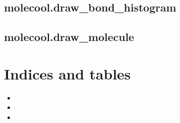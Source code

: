 \documentclass[letterpaper,10pt,english]{sphinxmanual}
\begin{document}
\begin{fulllineitems}
\label{\detokenize{autosummary/molecool.calculate_angle:molecool.calculate_angle}}
\end{fulllineitems}



\section{molecool.draw\_bond\_histogram}
\label{\detokenize{autosummary/molecool.draw_bond_histogram:molecool-draw-bond-histogram}}\label{\detokenize{autosummary/molecool.draw_bond_histogram::doc}}

\begin{fulllineitems}
\label{\detokenize{autosummary/molecool.draw_bond_histogram:molecool.draw_bond_histogram}}
\end{fulllineitems}



\section{molecool.draw\_molecule}
\label{\detokenize{autosummary/molecool.draw_molecule:molecool-draw-molecule}}\label{\detokenize{autosummary/molecool.draw_molecule::doc}}

\begin{fulllineitems}
\label{\detokenize{autosummary/molecool.draw_molecule:molecool.draw_molecule}}
\end{fulllineitems}



\chapter{Indices and tables}
\label{\detokenize{index:indices-and-tables}}\begin{itemize}
\item {} 

\item {} 

\item {} 

\end{itemize}



\renewcommand{\indexname}{Index}
\printindex
\end{document}
